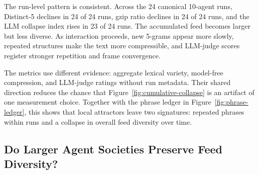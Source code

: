 \documentclass[11pt]{article}
\begin{document}


The run-level pattern is consistent. Across the 24 canonical 10-agent runs, Distinct-5 declines in 24 of 24 runs, gzip ratio declines in 24 of 24 runs, and the LLM collapse index rises in 23 of 24 runs. The accumulated feed becomes larger but less diverse. As interaction proceeds, new 5-grams appear more slowly, repeated structures make the text more compressible, and LLM-judge scores register stronger repetition and frame convergence.

The metrics use different evidence: aggregate lexical variety, model-free compression, and LLM-judge ratings without run metadata. Their shared direction reduces the chance that Figure~\ref{fig:cumulative-collapse} is an artifact of one measurement choice. Together with the phrase ledger in Figure~\ref{fig:phrase-ledger}, this shows that local attractors leave two signatures: repeated phrases within runs and a collapse in overall feed diversity over time.

\subsection{Do Larger Agent Societies Preserve Feed Diversity?}
\label{subsec:scale}
\end{document}
